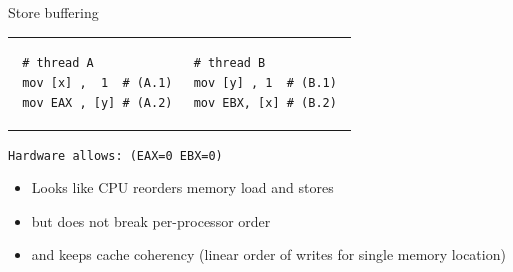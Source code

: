 \begin{frame}[fragile]{Store buffering}



 \begin{tabular}{p{} p{}}
 \begin{verbatim}
 # thread A
 mov [x] ,  1  # (A.1)
 mov EAX , [y] # (A.2)
 \end{verbatim}
 
 & 
 
 \begin{verbatim}
 # thread B          
 mov [y] , 1  # (B.1) 
 mov EBX, [x] # (B.2) 
 \end{verbatim}
 \end{tabular}

 \texttt{Hardware allows: (EAX=0 EBX=0)}

\begin{itemize}
    \item Looks like CPU reorders memory load and stores
    \item but does not break per-processor order 
    \item and keeps cache coherency (linear order of writes for single memory location)
\end{itemize}

\end{frame}


